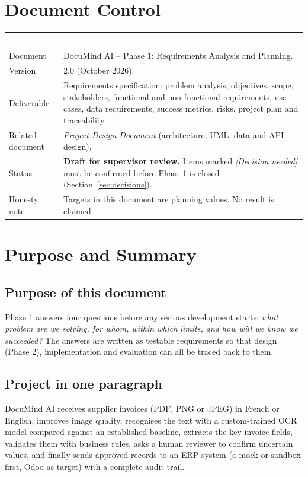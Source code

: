 \documentclass[11pt,a4paper]{report}
\newcommand{\projname}{DocuMind AI}
\newcommand{\docversion}{2.0}
\newcommand{\docdate}{October 2026}
\newcommand{\hdr}[1]{\textcolor{white}{\sffamily\bfseries #1}}
\newcommand{\tblstart}{\rowcolors{2}{white}{rowgray}\arrayrulecolor{teal!60}}
\newcommand{\hdrrow}{\rowcolor{navy}}
\begin{document}
\chapter*{Document Control}
\tblstart\small
\begin{longtable}{L{3.4cm}L{11.0cm}}
\hdrrow \hdr{Item} & \hdr{Description}\\ \endhead
Document & \projname{} -- Phase 1: Requirements Analysis and Planning.\\
Version & \docversion{} (\docdate).\\
Deliverable & Requirements specification: problem analysis, objectives, scope, stakeholders, functional and non-functional requirements, use cases, data requirements, success metrics, risks, project plan and traceability.\\
Related document & \emph{Project Design Document} (architecture, UML, data and API design).\\
Status & \textbf{Draft for supervisor review.} Items marked \emph{[Decision needed]} must be confirmed before Phase 1 is closed (Section~\ref{sec:decisions}).\\
Honesty note & Targets in this document are planning values. No result is claimed.\\
\hline
\end{longtable}
\clearpage
\tableofcontents
\clearpage
\listoffigures
\clearpage
{}
\setcounter{page}{1}

\chapter{Purpose and Summary}
\section{Purpose of this document}
Phase 1 answers four questions before any serious development starts: \emph{what problem are we solving, for whom, within which limits, and how will we know we succeeded?} The answers are written as testable requirements so that design (Phase 2), implementation and evaluation can all be traced back to them.

\section{Project in one paragraph}
\projname{} receives supplier invoices (PDF, PNG or JPEG) in French or English, improves image quality, recognises the text with a custom-trained OCR model compared against an established baseline, extracts the key invoice fields, validates them with business rules, asks a human reviewer to confirm uncertain values, and finally sends approved records to an ERP system (a mock or sandbox first, Odoo as target) with a complete audit trail.
\end{document}
